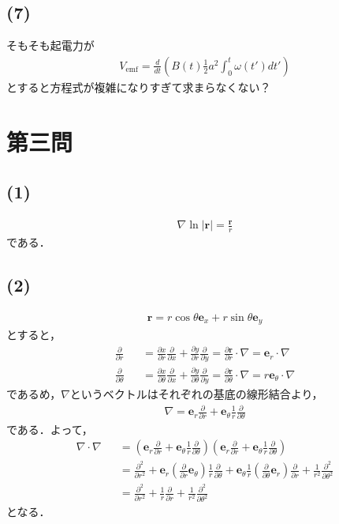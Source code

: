 \documentclass[12pt,dvipdfmx]{jsarticle}
\begin{document}
\subsection*{\large{(7)}}
そもそも起電力が
\begin{eqnarray}
  V_{\text{emf}} = \frac{d}{dt} \left( B(t) \frac{1}{2}a^2 \int_0^t \omega(t')dt' \right)
\end{eqnarray}
とすると方程式が複雑になりすぎて求まらなくない？
\newpage
\section*{\Large{第三問}}
\subsection*{\large{(1)}}
\begin{eqnarray}
  \nabla\ln |\bm{r}| = \frac{\bm{r}}{r}
\end{eqnarray}
である．
\subsection*{\large{(2)}}
\begin{eqnarray}
  \bm{r} = r\cos\theta\bm{e}_x + r\sin\theta\bm{e}_y
\end{eqnarray}
とすると，
\begin{eqnarray}
  \frac{\partial}{\partial r} &&= \frac{\partial x}{\partial r}\frac{\partial }{\partial x} + \frac{\partial y}{\partial r}\frac{\partial }{\partial y} =\frac{\partial\bm{r}}{\partial r}\cdot\nabla =  \bm{e}_r \cdot\nabla\\
  \frac{\partial}{\partial \theta} &&= \frac{\partial x}{\partial \theta}\frac{\partial }{\partial x} + \frac{\partial y}{\partial \theta}\frac{\partial }{\partial y}=\frac{\partial\bm{r}}{\partial \theta}\cdot\nabla = r\bm{e}_\theta \cdot\nabla
\end{eqnarray}
であるめ，$\nabla$というベクトルはそれぞれの基底の線形結合より，
\begin{eqnarray}
  \nabla = \bm{e}_r\frac{\partial}{\partial r} +  \bm{e}_\theta\frac{1}{r}\frac{\partial}{\partial \theta}
\end{eqnarray}
である．よって，
\begin{eqnarray}
  \nabla\cdot\nabla &&= \left( \bm{e}_r\frac{\partial}{\partial r} +  \bm{e}_\theta\frac{1}{r}\frac{\partial}{\partial \theta} \right)\left(\bm{e}_r\frac{\partial}{\partial r} +  \bm{e}_\theta\frac{1}{r}\frac{\partial}{\partial \theta}\right)\\
  &&= \frac{\partial^2}{\partial r^2} + \bm{e}_r \left( \frac{\partial}{\partial r} \bm{e}_\theta \right) \frac{1}{r}\frac{\partial}{\partial\theta} + \bm{e}_\theta \frac{1}{r}\left( \frac{\partial}{\partial\theta}\bm{e}_r \right)\frac{\partial}{\partial r} + \frac{1}{r^2}\frac{\partial^2}{\partial \theta^2}\\
  &&= \frac{\partial^2}{\partial r^2} + \frac{1}{r}\frac{\partial}{\partial r} + \frac{1}{r^2}\frac{\partial^2}{\partial\theta^2}
\end{eqnarray}
となる．
\end{document}
